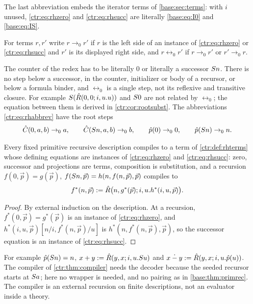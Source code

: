The last abbreviation embeds the iterator terms of \cref{base:sec:terms}: with $i$ unused,
\eqref{ctr:eq:rhzero} and \eqref{ctr:eq:rhsucc} are literally \eqref{base:eq:I0} and
\eqref{base:eq:IS}.

\begin{definition}\label{ctr:def:rootstep}
For terms $r,r'$ write $r\to_0 r'$ if $r$ is the left side of an instance of
\eqref{ctr:eq:rhzero} or \eqref{ctr:eq:rhsucc} and $r'$ is its displayed right side, and
$r\leftrightarrow_0 r'$ if $r\to_0 r'$ or $r'\to_0 r$.
\end{definition}

The counter of the redex has to be literally $0$ or literally a successor $S n$. There is no
step below a successor, in the counter, initializer or body of a recursor, or below a formula
binder, and $\leftrightarrow_0$ is a single step, not its reflexive and transitive closure. For
example $S(\hat R(0,0;i,u.u))$ and $S 0$ are not related by $\leftrightarrow_0$; the
equation between them is derived in \cref{ctr:cor:rootsubst}. The abbreviations
\eqref{ctr:eq:rhabbrev} have the root steps
\[
 \hat C(0,a,b)\to_0 a,\qquad \hat C(S n,a,b)\to_0 b,\qquad
 \hat p(0)\to_0 0,\qquad \hat p(S n)\to_0 n .
\]

\begin{proposition}\label{ctr:prop:rhcompiler}
Every fixed primitive recursive description compiles to a term of \cref{ctr:def:rhterms}
whose defining equations are instances of \eqref{ctr:eq:rhzero} and \eqref{ctr:eq:rhsucc}:
zero, successor and projections are terms, composition is substitution, and a recursion
$f(0,\vec p)=g(\vec p)$, $f(S n,\vec p)=h(n,f(n,\vec p),\vec p)$ compiles to
\[
 f^*(n,\vec p)\mathrel{:=}\hat R\bigl(n,g^*(\vec p);i,u.h^*(i,u,\vec p)\bigr).
\]
\end{proposition}
\begin{proof}
By external induction on the description. At a recursion,
$f^*(0,\vec p)=g^*(\vec p)$ is an instance of \eqref{ctr:eq:rhzero}, and
$h^*(i,u,\vec p)[n/i,f^*(n,\vec p)/u]$ is $h^*(n,f^*(n,\vec p),\vec p)$, so the successor
equation is an instance of \eqref{ctr:eq:rhsucc}.
\end{proof}

For example $\hat p(S n)=n$, $x+y\mathrel{:=}\hat R(y,x;i,u.S u)$ and
$x\mathbin{\dot-}y\mathrel{:=}\hat R(y,x;i,u.\hat p(u))$. The compiler of \cref{ctr:thm:compiler}
needs the decoder because the seeded recursor starts at $S a$; here no wrapper is needed,
and no pairing as in \cref{base:thm:primrec}. The compiler is an external recursion on finite
descriptions, not an evaluator inside a theory.

